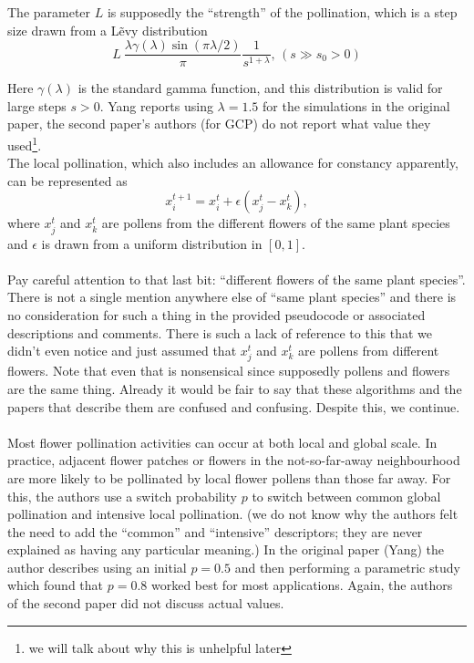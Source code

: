 The parameter $L$ is supposedly the ``strength'' of the pollination, which is a step size drawn from a L\~evy distribution
\begin{equation}
L ~ \frac{\lambda \gamma \left( \lambda \right) \sin \left( \pi \lambda / 2 \right) }{\pi} \frac{1}{s^{1+\lambda}}, \, (s \gg s_0 > 0)
\end{equation}

Here $\gamma(\lambda)$ is the standard gamma function, and this distribution is valid for large steps $s>0$. Yang reports using $\lambda = 1.5$ for the simulations in the original paper, the second paper's authors (for GCP) do not report what value they used\footnote{we will talk about why this is unhelpful later}.\\
The local pollination, which also includes an allowance for constancy apparently, can be represented as
\begin{equation}
x_i^{t+1} = x_i^{t} + \epsilon(x_j^{t} - x_k^{t}),
\end{equation}
where $x_j^{t}$ and $x_k^{t}$ are pollens from the different flowers of the same plant species and $\epsilon$ is drawn from a uniform distribution in $[0,1]$.
\\~\\

Pay careful attention to that last bit: ``different flowers of the same plant species''. There is not a single mention anywhere else of ``same plant species'' and there is no consideration for such a thing in the provided pseudocode or associated descriptions and comments. There is such a lack of reference to this that we didn't even notice and just assumed that $x_j^{t}$ and $x_k^{t}$ are pollens from different flowers. Note that even that is nonsensical since supposedly pollens and flowers are the same thing. Already it would be fair to say that these algorithms and the papers that describe them are confused and confusing.
Despite this, we continue.\\~\\

Most flower pollination activities can occur at both local and global scale. In practice, adjacent flower patches or flowers in the not-so-far-away neighbourhood are more likely to be pollinated by local flower pollens than those far away. For this, the authors use a switch probability $p$ to switch between common global pollination and intensive local pollination. (we do not know why the authors felt the need to add the ``common'' and ``intensive'' descriptors; they are never explained as having any particular meaning.) In the original paper (Yang) the author describes using an initial $p = 0.5$ and then performing a parametric study which found that $p = 0.8$ worked best for most applications. Again, the authors of the second paper did not discuss actual values.\\

